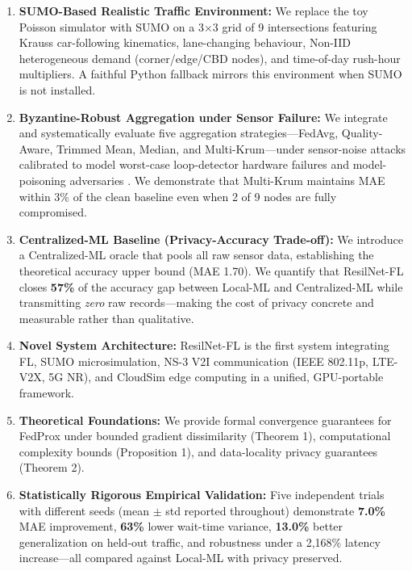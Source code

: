 \documentclass[conference]{IEEEtran}
\begin{document}
\begin{enumerate}
    \item \textbf{SUMO-Based Realistic Traffic Environment:} We replace the toy Poisson simulator with SUMO \cite{lopez2018sumo} on a 3$\times$3 grid of 9 intersections featuring Krauss car-following kinematics, lane-changing behaviour, Non-IID heterogeneous demand (corner/edge/CBD nodes), and time-of-day rush-hour multipliers. A faithful Python fallback mirrors this environment when SUMO is not installed.

    \item \textbf{Byzantine-Robust Aggregation under Sensor Failure:} We integrate and systematically evaluate five aggregation strategies—FedAvg, Quality-Aware, Trimmed Mean, Median, and Multi-Krum—under sensor-noise attacks calibrated to model worst-case loop-detector hardware failures and model-poisoning adversaries \cite{fang2020local}. We demonstrate that Multi-Krum maintains MAE within 3\% of the clean baseline even when 2 of 9 nodes are fully compromised.

    \item \textbf{Centralized-ML Baseline (Privacy-Accuracy Trade-off):} We introduce a Centralized-ML oracle that pools all raw sensor data, establishing the theoretical accuracy upper bound (MAE 1.70). We quantify that ResilNet-FL closes \textbf{57\%} of the accuracy gap between Local-ML and Centralized-ML while transmitting \emph{zero} raw records—making the cost of privacy concrete and measurable rather than qualitative.

    \item \textbf{Novel System Architecture:} ResilNet-FL is the first system integrating FL, SUMO microsimulation, NS-3 V2I communication (IEEE 802.11p, LTE-V2X, 5G NR), and CloudSim edge computing in a unified, GPU-portable framework.

    \item \textbf{Theoretical Foundations:} We provide formal convergence guarantees for FedProx under bounded gradient dissimilarity (Theorem 1), computational complexity bounds (Proposition 1), and data-locality privacy guarantees (Theorem 2).

    \item \textbf{Statistically Rigorous Empirical Validation:} Five independent trials with different seeds (mean $\pm$ std reported throughout) demonstrate \textbf{7.0\%} MAE improvement, \textbf{63\%} lower wait-time variance, \textbf{13.0\%} better generalization on held-out traffic, and robustness under a 2,168\% latency increase—all compared against Local-ML with privacy preserved.
\end{enumerate}
\end{document}
